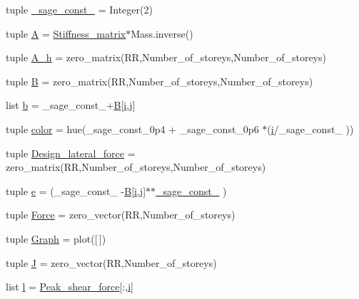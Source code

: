 \begin{DoxyCompactItemize}
\item 
tuple \hyperlink{a00039_ad85d7913c0e40b9e1f30e64611a0fafa}{\+\_\+sage\+\_\+const\+\_} = Integer(2)
\item 
tuple \hyperlink{a00039_ad101f166a53497f04b37636bcadbfe65}{A} = \hyperlink{a00039_a0011be18dbc87087d6aaf28802f121c0}{Stiffness\+\_\+matrix}$\ast$Mass.\+inverse()
\item 
tuple \hyperlink{a00039_a90e3156cc1a3ea63ba2d089e78b34e3d}{A\+\_\+h} = zero\+\_\+matrix(R\+R,Number\+\_\+of\+\_\+storeys,Number\+\_\+of\+\_\+storeys)
\item 
tuple \hyperlink{a00039_a6ae8768d11174f5baf9febc5244d6f06}{B} = zero\+\_\+matrix(R\+R,Number\+\_\+of\+\_\+storeys,Number\+\_\+of\+\_\+storeys)
\item 
list \hyperlink{a00039_ab1e783015bffd2e1d395a9099143d967}{b} = \+\_\+sage\+\_\+const\+\_+\hyperlink{a00039_a6ae8768d11174f5baf9febc5244d6f06}{B}\mbox{[}\hyperlink{a00008_a6dbbc96f4222af2f6c18c8e60f41726b}{i},\hyperlink{a00008_ac86694252f8dfdb19aaeadc4b7c342c6}{j}\mbox{]}
\item 
tuple \hyperlink{a00039_aeabbf69db1809807f065c2d1e9a62567}{color} = hue(\+\_\+sage\+\_\+const\+\_\+0p4 + \+\_\+sage\+\_\+const\+\_\+0p6 $\ast$(\hyperlink{a00008_a6dbbc96f4222af2f6c18c8e60f41726b}{i}/\+\_\+sage\+\_\+const\+\_ ))
\item 
tuple \hyperlink{a00039_a35df7d294c439792977f174dd5b04ec1}{Design\+\_\+lateral\+\_\+force} = zero\+\_\+matrix(R\+R,Number\+\_\+of\+\_\+storeys,Number\+\_\+of\+\_\+storeys)
\item 
tuple \hyperlink{a00039_aa7f4fe671f919f7f067f9337ef9e02c0}{e} = (\+\_\+sage\+\_\+const\+\_ -\/\hyperlink{a00039_a6ae8768d11174f5baf9febc5244d6f06}{B}\mbox{[}\hyperlink{a00008_a6dbbc96f4222af2f6c18c8e60f41726b}{i},\hyperlink{a00008_ac86694252f8dfdb19aaeadc4b7c342c6}{j}\mbox{]}$\ast$$\ast$\hyperlink{a00039_ad85d7913c0e40b9e1f30e64611a0fafa}{\+\_\+sage\+\_\+const\+\_} )
\item 
tuple \hyperlink{a00039_a4612305e50326c88dea04736a647c238}{Force} = zero\+\_\+vector(R\+R,Number\+\_\+of\+\_\+storeys)
\item 
tuple \hyperlink{a00039_ad40f6b3437e83a0385177ac65a317b97}{Graph} = plot(\mbox{[}$\,$\mbox{]})
\item 
tuple \hyperlink{a00039_a00488f5887e168f7781b6fb94dd08518}{J} = zero\+\_\+vector(R\+R,Number\+\_\+of\+\_\+storeys)
\item 
list \hyperlink{a00039_a027916efc284622d928c1d8383917f6d}{l} = \hyperlink{a00039_a6461376590c833b81e5920e96ed3d5bf}{Peak\+\_\+shear\+\_\+force}\mbox{[}\+:,\hyperlink{a00008_a6dbbc96f4222af2f6c18c8e60f41726b}{i}\mbox{]}
$$
\end{DoxyCompactItemize}
